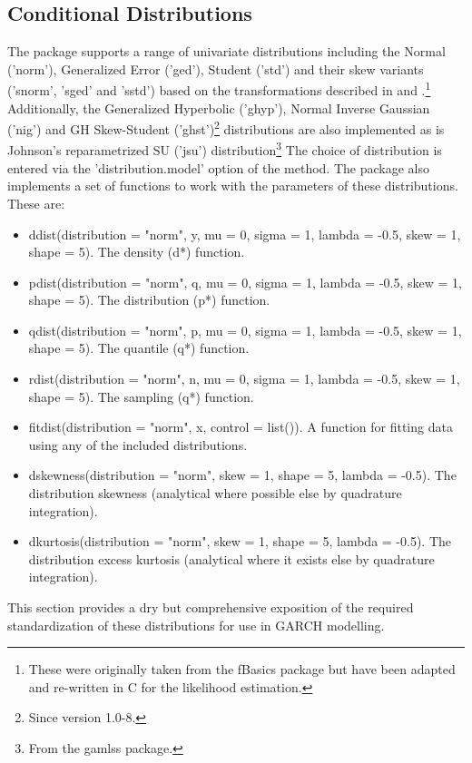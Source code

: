 \subsection{Conditional Distributions}\label{section:distributions}
The \verb@rugarch@ package supports a range of univariate distributions
including the Normal ('norm'), Generalized Error ('ged'), Student ('std')
and their skew variants ('snorm', 'sged' and 'sstd') based on the transformations
described in \cite{Fernandez1998} and \cite{Ferreira2006}.\footnote{These were
originally taken from the fBasics package  but have been adapted and re-written
in C for the likelihood estimation.} Additionally, the Generalized Hyperbolic
('ghyp'), Normal Inverse Gaussian ('nig') and GH Skew-Student ('ghst')\footnote{Since version 1.0-8.}
distributions are also implemented as is Johnson's reparametrized SU ('jsu')
distribution\footnote{From the gamlss package.} The choice of distribution is entered via the
'distribution.model' option of the \verb@ugarchspec@ method. The package also
implements a set of functions to work with the parameters of these distributions.
These are:
\begin{itemize}
\item ddist(distribution = "norm", y, mu = 0, sigma = 1, lambda = -0.5, skew = 1, shape = 5). The density (d*) function.
\item pdist(distribution = "norm", q, mu = 0, sigma = 1, lambda = -0.5, skew = 1, shape = 5). The distribution (p*) function.
\item qdist(distribution = "norm", p, mu = 0, sigma = 1, lambda = -0.5, skew = 1, shape = 5). The quantile (q*) function.
\item rdist(distribution = "norm", n, mu = 0, sigma = 1, lambda = -0.5, skew = 1, shape = 5). The sampling (q*) function.
\item fitdist(distribution = "norm", x, control = list()). A function for fitting data using any of the included distributions.
\item dskewness(distribution = "norm", skew = 1, shape = 5, lambda = -0.5). The distribution skewness (analytical where possible else by quadrature integration).
\item dkurtosis(distribution = "norm", skew = 1, shape = 5, lambda = -0.5). The distribution excess kurtosis (analytical where it exists else by quadrature integration).
\end{itemize}
This section provides a dry but comprehensive exposition of the required
standardization of these distributions for use in GARCH modelling.


